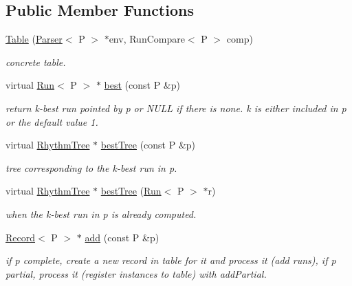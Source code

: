 \subsection*{Public Member Functions}
\begin{DoxyCompactItemize}
\item 
\mbox{\hyperlink{classTable_a75c05943dcc9afb9ee0af010143a692e}{Table}} (\mbox{\hyperlink{classParser}{Parser}}$<$ P $>$ $\ast$env, Run\+Compare$<$ P $>$ comp)
\begin{DoxyCompactList}\small\item\em concrete table. \end{DoxyCompactList}\item 
virtual \mbox{\hyperlink{classRun}{Run}}$<$ P $>$ $\ast$ \mbox{\hyperlink{classTable_a2e8c9b5856741684b1ec7d8fc640cc81}{best}} (const P \&p)
\begin{DoxyCompactList}\small\item\em return k-\/best run pointed by p or N\+U\+LL if there is none. k is either included in p or the default value 1. \end{DoxyCompactList}\item 
\mbox{\label{classTable_ace006d9777eee7bb4835f821bc5c9467}} 
virtual \mbox{\hyperlink{classRhythmTree}{Rhythm\+Tree}} $\ast$ \mbox{\hyperlink{classTable_ace006d9777eee7bb4835f821bc5c9467}{best\+Tree}} (const P \&p)
\begin{DoxyCompactList}\small\item\em tree corresponding to the k-\/best run in p. \end{DoxyCompactList}\item 
\mbox{\label{classTable_a53788fcf01e286097b3c0d7c7573d61f}} 
virtual \mbox{\hyperlink{classRhythmTree}{Rhythm\+Tree}} $\ast$ \mbox{\hyperlink{classTable_a53788fcf01e286097b3c0d7c7573d61f}{best\+Tree}} (\mbox{\hyperlink{classRun}{Run}}$<$ P $>$ $\ast$r)
\begin{DoxyCompactList}\small\item\em when the k-\/best run in p is already computed. \end{DoxyCompactList}\item 
\mbox{\hyperlink{classRecord}{Record}}$<$ P $>$ $\ast$ \mbox{\hyperlink{classTable_a69ccf554edee39f61692c26a3b4667e1}{add}} (const P \&p)
\begin{DoxyCompactList}\small\item\em if p complete, create a new record in table for it and process it (add runs), if p partial, process it (register instances to table) with add\+Partial. \end{DoxyCompactList}\item 

\end{DoxyCompactItemize}
